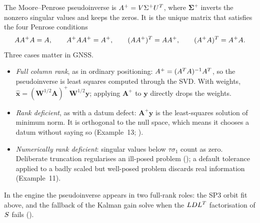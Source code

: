 \documentclass[main.tex]{subfiles}
\begin{document}
The Moore--Penrose pseudoinverse is $A^{+} = V\Sigma^{+}U^{T}$,
where $\bm{\Sigma}^{+}$ inverts the nonzero singular values and keeps the
zeros.  It is the unique matrix that satisfies the four Penrose conditions
\begin{equation}
AA^{+}A = A,
\qquad
A^{+}AA^{+} = A^{+},
\qquad
(AA^{+})^{T} = AA^{+},
\qquad
(A^{+}A)^{T} = A^{+}A.
\label{eq:la-penrose}
\end{equation}
Three cases matter in GNSS.
\begin{itemize}[leftmargin=*, itemsep=1pt]
\item \emph{Full column rank}, as in ordinary positioning:
      $A^{+} = (A^{T}A)^{-1}A^{T}$, so the pseudoinverse is
      least squares computed through the SVD.  With weights,
      $\hat{\bm{x}} = (\bm{W}^{1/2}\bm{A})^{+}\,\bm{W}^{1/2}\bm{y}$; applying
      $\bm{A}^{+}$ to $\bm{y}$ directly drops the weights.
\item \emph{Rank deficient}, as with a datum defect: $\bm{A}^{+}\bm{y}$ is the
      least-squares solution of minimum norm.  It is orthogonal to the null
      space, which means it chooses a datum without saying so (Example~13;
      \cite{teunissen1985generalised}).
\item \emph{Numerically rank deficient}: singular values below $\tau\sigma_1$
      count as zero.  Deliberate truncation regularises an ill-posed problem
      (); a default tolerance applied to a badly scaled but
      well-posed problem discards real information (Example~11).
\end{itemize}
In the engine the pseudoinverse appears in two full-rank roles: the SP3
orbit fit above, and the fallback of the Kalman gain solve when the
$LDL^{T}$ factorisation of $S$ fails ().
\end{document}
